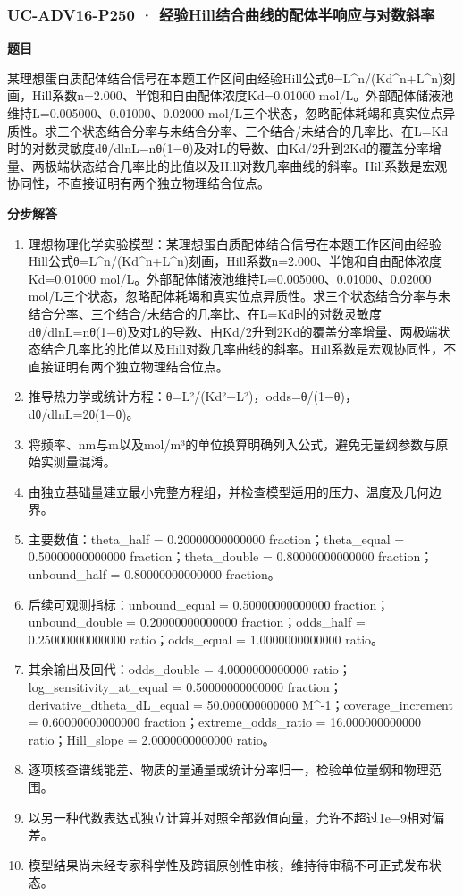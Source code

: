 \documentclass[UTF8,11pt,a4paper]{ctexart}
\begin{document}
\subsubsection*{UC-ADV16-P250 · 经验Hill结合曲线的配体半响应与对数斜率}
\noindent\textbf{题目}\par
某理想蛋白质配体结合信号在本题工作区间由经验Hill公式θ=L\textasciicircum{}n/(Kd\textasciicircum{}n+L\textasciicircum{}n)刻画，Hill系数n=2.000、半饱和自由配体浓度Kd=0.01000 mol/L。外部配体储液池维持L=0.005000、0.01000、0.02000 mol/L三个状态，忽略配体耗竭和真实位点异质性。求三个状态结合分率与未结合分率、三个结合/未结合的几率比、在L=Kd时的对数灵敏度dθ/dlnL=nθ(1−θ)及对L的导数、由Kd/2升到2Kd的覆盖分率增量、两极端状态结合几率比的比值以及Hill对数几率曲线的斜率。Hill系数是宏观协同性，不直接证明有两个独立物理结合位点。\par
\medskip\noindent\textbf{分步解答}
\begin{enumerate}
\item 理想物理化学实验模型：某理想蛋白质配体结合信号在本题工作区间由经验Hill公式θ=L\textasciicircum{}n/(Kd\textasciicircum{}n+L\textasciicircum{}n)刻画，Hill系数n=2.000、半饱和自由配体浓度Kd=0.01000 mol/L。外部配体储液池维持L=0.005000、0.01000、0.02000 mol/L三个状态，忽略配体耗竭和真实位点异质性。求三个状态结合分率与未结合分率、三个结合/未结合的几率比、在L=Kd时的对数灵敏度dθ/dlnL=nθ(1−θ)及对L的导数、由Kd/2升到2Kd的覆盖分率增量、两极端状态结合几率比的比值以及Hill对数几率曲线的斜率。Hill系数是宏观协同性，不直接证明有两个独立物理结合位点。
\item 推导热力学或统计方程：θ=L²/(Kd²+L²)，odds=θ/(1−θ)，dθ/dlnL=2θ(1−θ)。
\item 将频率、nm与m以及mol/m³的单位换算明确列入公式，避免无量纲参数与原始实测量混淆。
\item 由独立基础量建立最小完整方程组，并检查模型适用的压力、温度及几何边界。
\item 主要数值：theta\_half = 0.20000000000000 fraction；theta\_equal = 0.50000000000000 fraction；theta\_double = 0.80000000000000 fraction；unbound\_half = 0.80000000000000 fraction。
\item 后续可观测指标：unbound\_equal = 0.50000000000000 fraction；unbound\_double = 0.20000000000000 fraction；odds\_half = 0.25000000000000 ratio；odds\_equal = 1.0000000000000 ratio。
\item 其余输出及回代：odds\_double = 4.0000000000000 ratio；log\_sensitivity\_at\_equal = 0.50000000000000 fraction；derivative\_dtheta\_dL\_equal = 50.000000000000 M\textasciicircum{}-1；coverage\_increment = 0.60000000000000 fraction；extreme\_odds\_ratio = 16.000000000000 ratio；Hill\_slope = 2.0000000000000 ratio。
\item 逐项核查谱线能差、物质的量通量或统计分率归一，检验单位量纲和物理范围。
\item 以另一种代数表达式独立计算并对照全部数值向量，允许不超过1e−9相对偏差。
\item 模型结果尚未经专家科学性及跨辑原创性审核，维持待审稿不可正式发布状态。
\end{enumerate}
\end{document}
